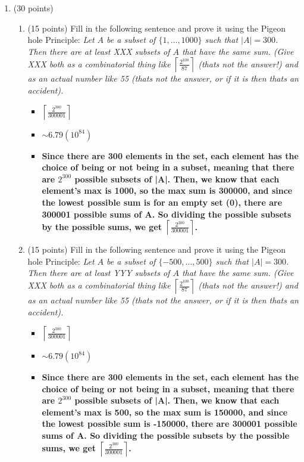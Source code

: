 \documentclass[12pt]{article}
\newcommand{\ceil}[1]{\left\lceil {#1}\right\rceil}
\begin{document}
\begin{enumerate}
\item 
(30 points) 
\begin{enumerate}
\item
(15 points) 
Fill in the following sentence and prove it using the Pigeon hole Principle:
{\it Let $A$ be a subset of $\{1,\ldots,1000\}$ such that $|A|=300$. 
Then there are at least XXX subsets of $A$ that have the same sum.
(Give XXX both as a combinatorial thing like $\ceil{\frac{2^{100}}{87}}$ (thats not
the answer!) and as an actual number like 55 (thats not the answer, or if it is then
thats an accident).} 
\begin{itemize}
    \item \textbf{$\ceil{\frac{2^{300}}{300001}}$}
    \item \textbf{$\sim6.79(10^{84})$}
    \item \textbf{Since there are 300 elements in the set, each element has the choice of being or not being in a subset, meaning that there are $2^{300}$ possible subsets of |A|. Then, we know that each element's max is 1000, so the max sum is 300000, and since the lowest possible sum is for an empty set (0), there are 300001 possible sums of A. So dividing the possible subsets by the possible sums, we get $\ceil{\frac{2^{300}}{300001}}$.}
\end{itemize}
\item
(15 points) 
Fill in the following sentence and prove it using the Pigeon hole Principle:
{\it Let $A$ be a subset of $\{-500,\ldots,500\}$ such that $|A|=300$. 
Then there are at least YYY subsets of $A$ that have the same sum.
(Give XXX both as a combinatorial thing like $\ceil{\frac{2^{100}}{87}}$ (thats not
the answer!) and as an actual number like 55 (thats not the answer, or if it is then
thats an accident).} 
\begin{itemize}
    \item \textbf{$\ceil{\frac{2^{300}}{300001}}$}
    \item \textbf{$\sim6.79(10^{84})$}
    \item \textbf{Since there are 300 elements in the set, each element has the choice of being or not being in a subset, meaning that there are $2^{300}$ possible subsets of |A|. Then, we know that each element's max is 500, so the max sum is 150000, and since the lowest possible sum is -150000, there are 300001 possible sums of A. So dividing the possible subsets by the possible sums, we get $\ceil{\frac{2^{300}}{300001}}$.}
\end{itemize}


\end{enumerate}
\end{enumerate}
\end{document}
